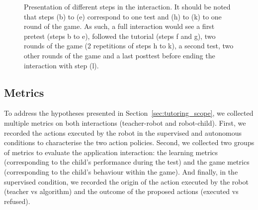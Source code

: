 \begin{figure}[ht]
	\caption{Presentation of different steps in the interaction. It should be noted that steps (b) to (e) correspond to one test and (h) to (k) to one round of the game. As such, a full interaction would see a first pretest (steps b to e), followed the tutorial (steps f and g), two rounds of the game (2 repetitions of steps h to k), a second test, two other rounds of the game and a last posttest before ending the interaction with step (l).}
	\label{fig:tuto_sequence}
\end{figure}


\subsection{Metrics} \label{sec:tuto_metric}


To address the hypotheses presented in Section~\ref{sec:tutoring_scope}, we collected multiple metrics on both interactions (teacher-robot and robot-child). First, we recorded the actions executed by the robot in the supervised and autonomous conditions to characterise the two action policies. Second, we collected two groups of metrics to evaluate the application interaction: the learning metrics (corresponding to the child's performance during the test) and the game metrics (corresponding to the child's behaviour within the game). And finally, in the supervised condition, we recorded the origin of the action executed by the robot (teacher vs algorithm) and the outcome of the proposed actions (executed vs refused).

